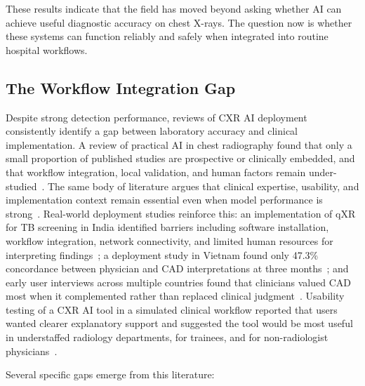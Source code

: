 \documentclass[conference, letterpaper]{IEEEtran}
\begin{document}
These results indicate that the field has moved beyond asking whether AI can achieve useful diagnostic accuracy on chest X-rays. The question now is whether these systems can function reliably and safely when integrated into routine hospital workflows.

\subsection{The Workflow Integration Gap}

Despite strong detection performance, reviews of CXR AI deployment consistently identify a gap between laboratory accuracy and clinical implementation. A review of practical AI in chest radiography found that only a small proportion of published studies are prospective or clinically embedded, and that workflow integration, local validation, and human factors remain under-studied~\cite{mongan2023review}. The same body of literature argues that clinical expertise, usability, and implementation context remain essential even when model performance is strong~\cite{ahmad2023systematic, mongan2023review}. Real-world deployment studies reinforce this: an implementation of qXR for TB screening in India identified barriers including software installation, workflow integration, network connectivity, and limited human resources for interpreting findings~\cite{vijayan2023india_tb_cad}; a deployment study in Vietnam found only 47.3\% concordance between physician and CAD interpretations at three months~\cite{innes2023vietnam_tb_cad}; and early user interviews across multiple countries found that clinicians valued CAD most when it complemented rather than replaced clinical judgment~\cite{creswell2023user_perspectives_tb}. Usability testing of a CXR AI tool in a simulated clinical workflow reported that users wanted clearer explanatory support and suggested the tool would be most useful in understaffed radiology departments, for trainees, and for non-radiologist physicians~\cite{cheung2022uai}.

Several specific gaps emerge from this literature:
\end{document}
